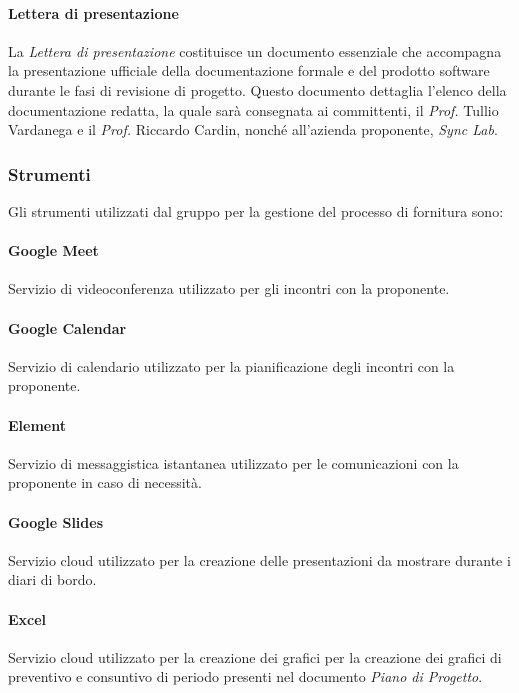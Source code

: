 \paragraph{Lettera di presentazione}
La \textit{Lettera di presentazione} costituisce un documento essenziale che accompagna la presentazione ufficiale della documentazione formale e del prodotto software durante le fasi di revisione di progetto. Questo documento dettaglia l'elenco della documentazione redatta, la quale sarà consegnata ai committenti, il \textit{Prof.} Tullio Vardanega e il \textit{Prof.} Riccardo Cardin, nonché all'azienda proponente, \textit{Sync Lab}.

\subsubsection{Strumenti}
Gli strumenti utilizzati dal gruppo per la gestione del processo di fornitura sono:
\paragraph{Google Meet}
Servizio di videoconferenza utilizzato per gli incontri con la proponente.
\paragraph{Google Calendar}
Servizio di calendario utilizzato per la pianificazione degli incontri con la proponente.
\paragraph{Element}
Servizio di messaggistica istantanea utilizzato per le comunicazioni con la proponente in caso di necessità.
\paragraph{Google Slides}
Servizio cloud utilizzato per la creazione delle presentazioni da mostrare durante i diari di bordo.
\paragraph{Excel}
Servizio cloud utilizzato per la creazione dei grafici per la creazione dei grafici di preventivo e consuntivo di periodo presenti nel documento \textit{Piano di Progetto}.